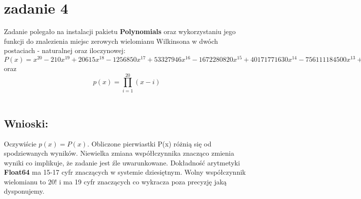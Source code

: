 \section{zadanie 4}
Zadanie polegało na instalacji pakietu \textbf{Polynomials} oraz wykorzystaniu jego funkcji do znalezienia miejsc zerowych wielomianu Wilkinsona w dwóch postaciach - naturalnej oraz iloczynowej:\\

\( P(x) = x^{20} - 210x^{19} + 20615x^{18} - 1256850x^{17} + 53327946x^{16} - 1672280820x^{15} + 40171771630x^{14} - 756111184500x^{13} + 11310276995381x^{12} - 135585182899530x^{11} + 1307535010540395x^{10} - 10142299865511450x^9 + 63030812099294896x^8 - 311333643161390640x^7 + 1206647803780373360x^6 - 3599979517947607200x^5 + 8037811822645051776x^4 - 12870931245150988800x^3 + 13803759753640704000x^2 - 8752948036761600000x^1 + 2432902008176640000x^0 \) \\
oraz
\[ p(x) = \prod_{i=1}^{20}(x-i)\]\\

\subsection{Wnioski:}
Oczywiście \(p(x) = P(x)\). Obliczone pierwiastki P(x) różnią się od spodziewanych wyników. Niewielka zmiana współłczynnika znacząco zmienia wyniki co implikuje, że zadanie jest źle uwarunkowane. Dokładność arytmetyki \textbf{Float64} ma 15-17 cyfr znaczących w systemie dziesiętnym. Wolny współczynnik wielomianu to \(20!\) i ma 19 cyfr znaczących co wykracza poza precyzję jaką dysponujemy.

